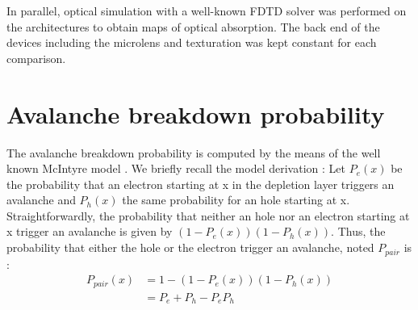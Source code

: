 \documentclass[10pt,a4paper,twocolumn]{article}
\begin{document}
In parallel, optical simulation with a well-known FDTD solver was performed on the architectures to obtain maps of optical absorption. The back end of the devices including the microlens and texturation was kept constant for each comparison.






\section{Avalanche breakdown probability}
The avalanche breakdown probability is computed by the means of the well known McIntyre model \cite{oldham_triggering_1972}. We briefly recall the model derivation : 
Let $P_e(x)$ be the probability that an electron starting at x in the depletion layer triggers an avalanche and $P_h(x)$ the same probability for an hole starting at x.
Straightforwardly, the probability that neither an hole nor an electron starting at x trigger an avalanche is given by $(1-P_e(x))(1-P_h(x))$.
Thus, the probability that either the hole or the electron trigger an avalanche, noted $P_{pair}$ is :
\begin{align*}
P_{pair}(x) &= 1 - \left( 1-P_e(x)\right)\left(1-P_h(x)\right)  \\
			&= P_e + P_h - P_e P_h
\end{align*}
\end{document}
